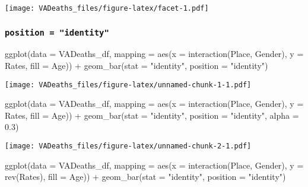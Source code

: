 \documentclass[
]{article}
\newenvironment{Shaded}{\begin{snugshade}}{\end{snugshade}}
\newcommand{\AttributeTok}[1]{\textcolor[rgb]{0.77,0.63,0.00}{#1}}
\newcommand{\FloatTok}[1]{\textcolor[rgb]{0.00,0.00,0.81}{#1}}
\newcommand{\FunctionTok}[1]{\textcolor[rgb]{0.00,0.00,0.00}{#1}}
\newcommand{\NormalTok}[1]{#1}
\newcommand{\SpecialCharTok}[1]{\textcolor[rgb]{0.00,0.00,0.00}{#1}}
\newcommand{\StringTok}[1]{\textcolor[rgb]{0.31,0.60,0.02}{#1}}
\begin{document}
\texttt{[image: VADeaths\_files/figure-latex/facet-1.pdf]}

\hypertarget{position-identity}{%
\subsubsection{\texorpdfstring{\texttt{position\ =\ "identity"}}{position = "identity"}}\label{position-identity}}

\begin{Shaded}
\begin{Highlighting}[]
\FunctionTok{ggplot}\NormalTok{(}\AttributeTok{data =}\NormalTok{ VADeaths\_df,}
              \AttributeTok{mapping =} \FunctionTok{aes}\NormalTok{(}\AttributeTok{x =} \FunctionTok{interaction}\NormalTok{(Place, Gender), }
                            \AttributeTok{y =}\NormalTok{ Rates, }
                            \AttributeTok{fill =}\NormalTok{ Age)) }\SpecialCharTok{+}
\FunctionTok{geom\_bar}\NormalTok{(}\AttributeTok{stat =} \StringTok{"identity"}\NormalTok{, }
         \AttributeTok{position =} \StringTok{"identity"}\NormalTok{)}
\end{Highlighting}
\end{Shaded}

\texttt{[image: VADeaths\_files/figure-latex/unnamed-chunk-1-1.pdf]}

\begin{Shaded}
\begin{Highlighting}[]
\FunctionTok{ggplot}\NormalTok{(}\AttributeTok{data =}\NormalTok{ VADeaths\_df,}
              \AttributeTok{mapping =} \FunctionTok{aes}\NormalTok{(}\AttributeTok{x =} \FunctionTok{interaction}\NormalTok{(Place, Gender), }
                            \AttributeTok{y =}\NormalTok{ Rates, }
                            \AttributeTok{fill =}\NormalTok{ Age)) }\SpecialCharTok{+}
\FunctionTok{geom\_bar}\NormalTok{(}\AttributeTok{stat =} \StringTok{"identity"}\NormalTok{, }
         \AttributeTok{position =} \StringTok{"identity"}\NormalTok{,}
         \AttributeTok{alpha =} \FloatTok{0.3}\NormalTok{)}
\end{Highlighting}
\end{Shaded}

\texttt{[image: VADeaths\_files/figure-latex/unnamed-chunk-2-1.pdf]}

\begin{Shaded}
\begin{Highlighting}[]
\FunctionTok{ggplot}\NormalTok{(}\AttributeTok{data =}\NormalTok{ VADeaths\_df,}
              \AttributeTok{mapping =} \FunctionTok{aes}\NormalTok{(}\AttributeTok{x =} \FunctionTok{interaction}\NormalTok{(Place, Gender), }
                            \AttributeTok{y =} \FunctionTok{rev}\NormalTok{(Rates), }
                            \AttributeTok{fill =}\NormalTok{ Age)) }\SpecialCharTok{+}
\FunctionTok{geom\_bar}\NormalTok{(}\AttributeTok{stat =} \StringTok{"identity"}\NormalTok{, }
         \AttributeTok{position =} \StringTok{"identity"}\NormalTok{)}
\end{Highlighting}
\end{Shaded}
\end{document}
